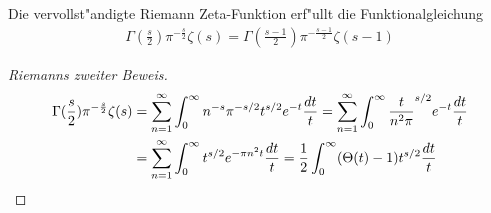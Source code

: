 	\begin{satz}
		Die vervollst"andigte Riemann Zeta-Funktion erf"ullt die Funktionalgleichung
		\begin{align*}
			\Gamma(\frac{s}{2}) \pi^{-\frac{s}{2}} \zeta(s) = \Gamma(\frac{s-1}{2}) \pi^{-\frac{s-1}{2}} \zeta(s-1)
		\end{align*}
	\end{satz}
	\begin{proof}[Riemanns zweiter Beweis]
		\begin{align*}
			\Gamma(\frac{s}{2}) \pi^{-\frac{s}{2}} \zeta(s)
				&= \sum_{n=1}^{\infty}  \int_{0}^{\infty} n^{-s} \pi^{-s/2} t^{s/2} e^{-t} \frac{\dx[t]}{t}
				= \sum_{n=1}^{\infty}  \int_{0}^{\infty} \frac{t}{n^2\pi}^{s/2} e^{-t} \frac{\dx[t]}{t}\\
				&= \sum_{n=1}^{\infty}  \int_{0}^{\infty} t^{s/2} e^{-\pi n^2 t} \frac{\dx[t]}{t}
				= \frac{1}{2} \int_{0}^{\infty} (\Theta(t) - 1) t^{s/2}  \frac{\dx[t]}{t}
		\end{align*}
		
	\end{proof}
	
